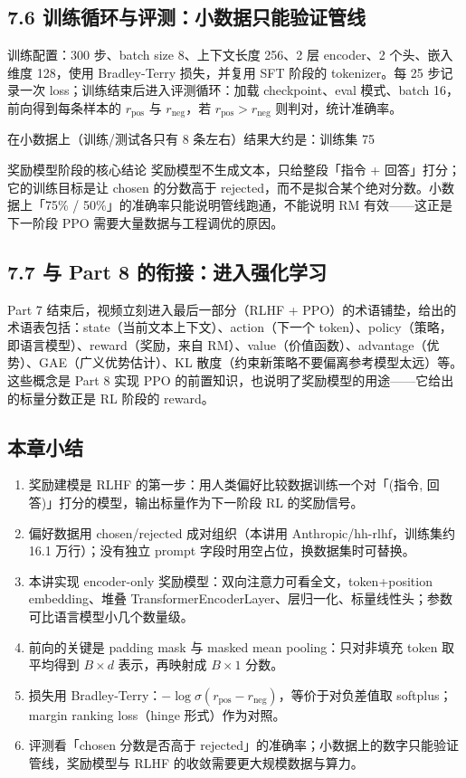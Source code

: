 \subsection{7.6 训练循环与评测：小数据只能验证管线}

训练配置：300 步、batch size 8、上下文长度 256、2 层 encoder、2 个头、嵌入维度 128，使用 Bradley-Terry 损失，并复用 SFT 阶段的 tokenizer。每 25 步记录一次 loss；训练结束后进入评测循环：加载 checkpoint、eval 模式、batch 16，前向得到每条样本的 $r_{\text{pos}}$ 与 $r_{\text{neg}}$，若 $r_{\text{pos}}>r_{\text{neg}}$ 则判对，统计准确率。

在小数据上（训练/测试各只有 8 条左右）结果大约是：训练集 75%

\begin{importantbox}{奖励模型阶段的核心结论}
奖励模型不生成文本，只给整段「指令 + 回答」打分；它的训练目标是让 chosen 的分数高于 rejected，而不是拟合某个绝对分数。小数据上「75\% / 50\%」的准确率只能说明管线跑通，不能说明 RM 有效——这正是下一阶段 PPO 需要大量数据与工程调优的原因。
\end{importantbox}

\subsection{7.7 与 Part 8 的衔接：进入强化学习}

Part 7 结束后，视频立刻进入最后一部分（RLHF + PPO）的术语铺垫，给出的术语表包括：state（当前文本上下文）、action（下一个 token）、policy（策略，即语言模型）、reward（奖励，来自 RM）、value（价值函数）、advantage（优势）、GAE（广义优势估计）、KL 散度（约束新策略不要偏离参考模型太远）等。这些概念是 Part 8 实现 PPO 的前置知识，也说明了奖励模型的用途——它给出的标量分数正是 RL 阶段的 reward。

\subsection{本章小结}
\begin{enumerate}
\item 奖励建模是 RLHF 的第一步：用人类偏好比较数据训练一个对「(指令, 回答)」打分的模型，输出标量作为下一阶段 RL 的奖励信号。
\item 偏好数据用 chosen/rejected 成对组织（本讲用 Anthropic/hh-rlhf，训练集约 16.1 万行）；没有独立 prompt 字段时用空占位，换数据集时可替换。
\item 本讲实现 encoder-only 奖励模型：双向注意力可看全文，token+position embedding、堆叠 TransformerEncoderLayer、层归一化、标量线性头；参数可比语言模型小几个数量级。
\item 前向的关键是 padding mask 与 masked mean pooling：只对非填充 token 取平均得到 $B\times d$ 表示，再映射成 $B\times 1$ 分数。
\item 损失用 Bradley-Terry：$-\log\sigma(r_{\text{pos}}-r_{\text{neg}})$，等价于对负差值取 softplus；margin ranking loss（hinge 形式）作为对照。
\item 评测看「chosen 分数是否高于 rejected」的准确率；小数据上的数字只能验证管线，奖励模型与 RLHF 的收敛需要更大规模数据与算力。
\end{enumerate}

